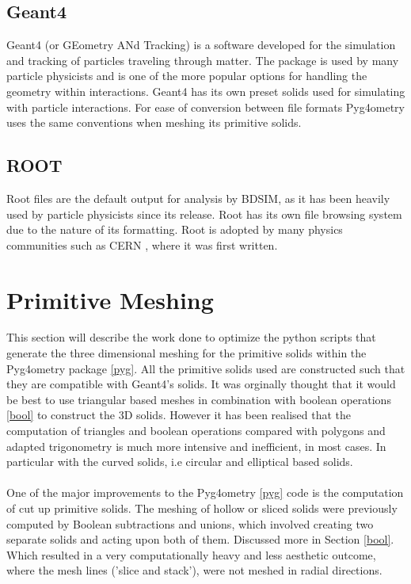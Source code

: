 \documentclass[12pt,a4paper]{article}
\begin{document}
\subsection{Geant4}\label{geant4}
\label{g4}
Geant4 (or GEometry ANd Tracking) is a software developed for the simulation and tracking of particles traveling through matter. The package is used by many particle physicists and is one of the more popular options for handling the geometry within interactions. Geant4 has its own preset solids used for simulating with particle interactions. For ease of conversion between file formats Pyg4ometry uses the same conventions when meshing its primitive solids.

\subsection{ROOT}\label{root}
Root files are the default output for analysis by BDSIM, as it has been heavily used by particle physicists since its release. Root has its own file browsing system due to the nature of its formatting. Root is adopted by many physics communities such as CERN \cite{cern}, where it was first written.


\newpage
\section{Primitive Meshing}
\label{prim}
This section will describe the work done to optimize the python scripts that generate the three dimensional meshing for the primitive solids within the Pyg4ometry package \ref{pyg}. All the primitive solids used are constructed such that they are compatible with Geant4's solids. It was orginally thought that it would be best to use triangular based meshes in combination with boolean operations \ref{bool} to construct the 3D solids. However it has been realised that the computation of triangles and boolean operations compared with polygons and adapted trigonometry is much more intensive and inefficient, in most cases. In particular with the curved solids, i.e circular and elliptical based solids.
\\\\
One of the major improvements to the Pyg4ometry \ref{pyg} code is the computation of cut up primitive solids. The meshing of hollow or sliced solids were previously computed by Boolean subtractions and unions, which involved creating two separate solids and acting upon both of them. Discussed more in Section \ref{bool}. Which resulted in a very computationally heavy and less aesthetic outcome, where the mesh lines ('slice and stack'), were not meshed in radial directions.
\end{document}
